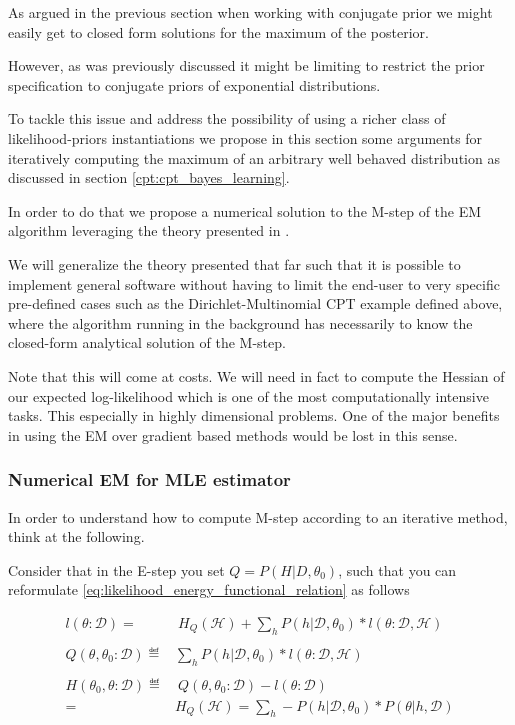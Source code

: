 \documentclass[11pt]{article}
\begin{document}
\begin{article}
As argued in the previous section when working with conjugate prior
we might easily get to closed form solutions for the maximum of the
posterior.

However, as was previously discussed it might be limiting to
restrict the prior specification to conjugate priors of exponential
distributions.

To tackle this issue and address the possibility of using a richer
class of likelihood-priors instantiations we propose in this
section some arguments for iteratively computing the maximum of an
arbitrary well behaved distribution as discussed in section \ref{cpt:cpt_bayes_learning}.

In order to do that we propose a numerical solution to the M-step
of the EM algorithm leveraging the theory presented in
\cite{ruud1989comparison}.

We will generalize the theory presented that far such that it is
possible to implement general software without having to limit the
end-user to very specific pre-defined cases such as the
Dirichlet-Multinomial CPT example defined above, where the algorithm
running in the background has necessarily to know the closed-form
analytical solution of the M-step.

Note that this will come at costs. We will need in fact to compute
the Hessian of our expected log-likelihood which is one of the most
computationally intensive tasks. This especially in highly
dimensional problems. One of the major benefits in using the EM over
gradient based methods would be lost in this sense.




\subsubsection{Numerical EM for MLE estimator}
\label{sec:orgde3fbb4}

In order to understand how to compute M-step according to an
iterative method, think at the following.

Consider that in the E-step you set \(Q = P (H| D, \theta_0)\), such
that you can reformulate
\ref{eq:likelihood_energy_functional_relation} as follows

\begin{align} \label{eq:likelihood_energy_iterative}
l (\theta: \mathscr{D}) =& \ H_Q (\mathscr {H}) + \sum_h P(h | \mathscr{D}, \theta_0) * l (\theta: \mathscr{D}, \mathscr{H}) \\
\nonumber\\
Q(\theta, \theta_0 : \mathscr{D}) \eqdef& \sum_h P(h | \mathscr{D}, \theta_0) * l (\theta: \mathscr{D}, \mathscr{H})\\
\nonumber\\  
H(\theta_0, \theta: \mathscr{D}) \eqdef& \ Q(\theta, \theta_0 : \mathscr{D}) - l (\theta: \mathscr{D}) \\
                                 =& H_Q (\mathscr {H}) = \sum_h - P(h | \mathscr{D}, \theta_0) * P(\theta | h, \mathscr{D}) \nonumber
\end{align}


\end{article}
\end{document}
